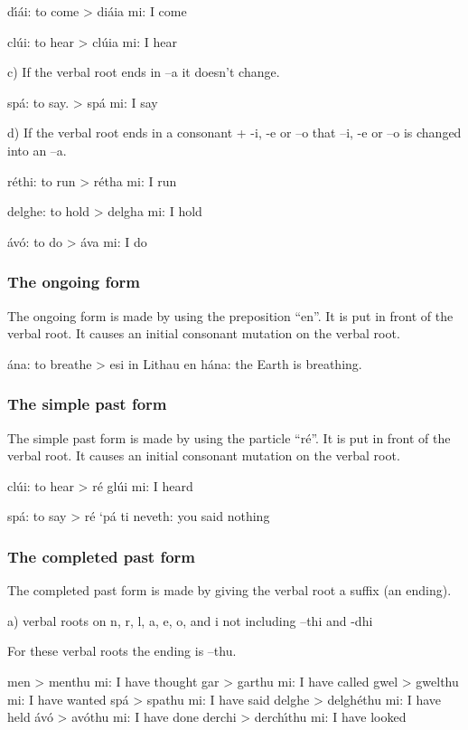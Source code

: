 d\'{\i}\'{a}i: to come
> di\'{a}ia mi: I come

cl\'{u}i: to hear
> cl\'{u}ia mi: I hear

c) If the verbal root ends in –a it doesn’t change.

sp\'{a}: to say.
> sp\'{a} mi: I say

d) If the verbal root ends in a consonant + -i, -e or –o that –i, -e or –o is changed into an –a.

r\'{e}thi: to run
> r\'{e}tha mi: I run

delghe: to hold
> delgha mi: I hold

\'{a}v\'{o}: to do
> \'{a}va mi: I do

\subsubsection{The ongoing form}

The ongoing form is made by using the preposition “en”. It is put in front of the verbal root. It causes an initial consonant mutation on the verbal root.

\'{a}na: to breathe
> esi in Lithau en h\'{a}na: the Earth is breathing.

\subsubsection{The simple past form}

The simple past form is made by using the particle “r\'{e}”. It is put in front of the verbal root. It causes an initial consonant mutation on the verbal root.

cl\'{u}i: to hear
> r\'{e} gl\'{u}i mi: I heard

sp\'{a}: to say
> r\'{e} ‘p\'{a} ti neveth: you said nothing

\subsubsection{The completed past form}

The completed past form is made by giving the verbal root a suffix (an ending). 

a) verbal roots on n, r, l, a, e, o, and i not including –thi and -dhi

For these verbal roots the ending is –thu.

men > menthu mi: I have thought
gar > garthu mi: I have called
gwel > gwelthu mi: I have wanted
sp\'{a} > spathu mi: I have said
delghe > delgh\'{e}thu mi: I have held
\'{a}v\'{o} > av\'{o}thu mi: I have done
derchi > derch\'{\i}thu mi: I have looked

